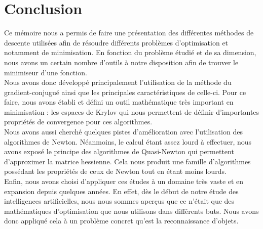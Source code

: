 \chapter{Conclusion}

Ce mémoire nous a permis de faire une présentation des différentes méthodes de descente utilisées afin de résoudre différents problèmes d'optimisation et notamment de minimisation. En fonction du problème étudié et de sa dimension, nous avons un certain nombre d'outils à notre disposition afin de trouver le minimiseur d'une fonction. \\

Nous avons donc développé principalement l'utilisation de la méthode du gradient-conjugué ainsi que les principales caractéristiques de celle-ci. Pour ce faire, nous avons établi et défini un outil mathématique très important en minimisation : les espaces de Krylov qui nous permettent de définir d'importantes propriétés de convergence pour ces algorithmes.\\

Nous avons aussi cherché quelques pistes d'amélioration avec l'utilisation des algorithmes de Newton. Néanmoins, le calcul étant assez lourd à effectuer, nous avons exposé le principe des algorithmes de Quasi-Newton qui permettent d'approximer la matrice hessienne. Cela nous produit une famille d'algorithmes possédant les propriétés de ceux de Newton tout en étant moins lourds.\\

Enfin, nous avons choisi d'appliquer ces études à un domaine très vaste et en expansion depuis quelques années. En effet, dès le début de notre étude des intelligences artificielles, nous nous sommes aperçus que ce n'était que des mathématiques d'optimisation que nous utilisons dans différents buts. Nous avons donc appliqué cela à un problème concret qu'est la reconnaissance d'objets. 